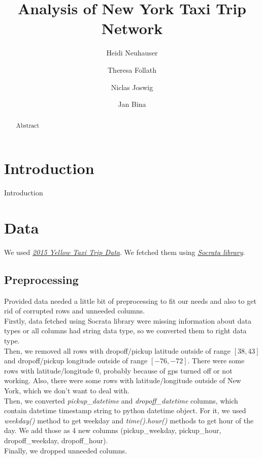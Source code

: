 \documentclass[sigconf]{acmart}
\begin{document}
\title{Analysis of New York Taxi Trip Network}

\author{Heidi Neuhauser}
 
\author{Theresa Follath}

\author{Niclas Joswig}

\author{Jan Bina}


\begin{abstract}
Abstract
\end{abstract}


\maketitle

\section{Introduction}
Introduction

\section{Data}
We used \emph{\href{https://data.cityofnewyork.us/view/ba8s-jw6u}{2015 Yellow Taxi Trip Data}}. We fetched them using \emph{\href{https://dev.socrata.com}{Socrata library}}.

\subsection{Preprocessing}
Provided data needed a little bit of preprocessing to fit our needs and also to get rid of corrupted rows and unneeded columns. \\
Firstly, data fetched using Socrata library were missing information about data types or all columns had string data type, so we converted them to right data type. \\
Then, we removed all rows with dropoff/pickup latitude outside of range \(\left[38, 43\right]\) and dropoff/pickup longitude outside of range \(\left[-76, -72\right]\). There were some rows with latitude/longitude $0$, probably because of gps turned off or not working. Also, there were some rows with latitude/longitude outside of New York, which we don't want to deal with. \\
Then, we converted \emph{pickup\_datetime} and \emph{dropoff\_datetime} columns, which contain datetime timestamp string to python datetime object. For it, we used \emph{weekday()} method to get weekday and \emph{time().hour()} methods to get hour of the day. We add those as 4 new columns (pickup\_weekday, pickup\_hour, dropoff\_weekday, dropoff\_hour). \\
Finally, we dropped unneeded columns.
\end{document}
